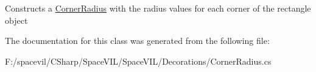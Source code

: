 Constructs a \mbox{\hyperlink{class_space_v_i_l_1_1_decorations_1_1_corner_radius}{Corner\+Radius}} with the radius values for each corner of the rectangle object 



The documentation for this class was generated from the following file\+:\begin{DoxyCompactItemize}
\item 
F\+:/spacevil/\+C\+Sharp/\+Space\+V\+I\+L/\+Space\+V\+I\+L/\+Decorations/Corner\+Radius.\+cs\end{DoxyCompactItemize}
